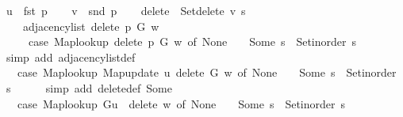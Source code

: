 \begin{isabellebody}
\ {\isacharquery}{\kern0pt}u\ {\isacharequal}{\kern0pt}\ {\isachardoublequoteopen}fst\ p{\isachardoublequoteclose}\isanewline
\ \ \isamarkupfalse%
\ {\isacharquery}{\kern0pt}v\ {\isacharequal}{\kern0pt}\ {\isachardoublequoteopen}snd\ p{\isachardoublequoteclose}\isanewline
\ \ \isamarkupfalse%
\ {\isacharquery}{\kern0pt}delete\ {\isacharequal}{\kern0pt}\ {\isachardoublequoteopen}Set{\isacharunderscore}{\kern0pt}delete\ {\isacharquery}{\kern0pt}v\ s{\isachardoublequoteclose}\isanewline
\ \ \isamarkupfalse%
\isanewline
\ \ \ \ {\isachardoublequoteopen}adjacency{\isacharunderscore}{\kern0pt}list\ {\isacharparenleft}{\kern0pt}delete\ p\ G{\isacharparenright}{\kern0pt}\ w\ {\isacharequal}{\kern0pt}\isanewline
\ \ \ \ \ {\isacharparenleft}{\kern0pt}case\ Map{\isacharunderscore}{\kern0pt}lookup\ {\isacharparenleft}{\kern0pt}delete\ p\ G{\isacharparenright}{\kern0pt}\ w\ of\ None\ {\isasymRightarrow}\ {\isacharbrackleft}{\kern0pt}{\isacharbrackright}{\kern0pt}\ {\isacharbar}{\kern0pt}\ Some\ s\ {\isasymRightarrow}\ Set{\isacharunderscore}{\kern0pt}inorder\ s{\isacharparenright}{\kern0pt}{\isachardoublequoteclose}\isanewline
\ \ \ \ \isamarkupfalse%
\ {\isacharparenleft}{\kern0pt}simp\ add{\isacharcolon}{\kern0pt}\ adjacency{\isacharunderscore}{\kern0pt}list{\isacharunderscore}{\kern0pt}def{\isacharparenright}{\kern0pt}\isanewline
\ \ \isamarkupfalse%
\ \isamarkupfalse%
\ {\isachardoublequoteopen}{\isachardot}{\kern0pt}{\isachardot}{\kern0pt}{\isachardot}{\kern0pt}\ {\isacharequal}{\kern0pt}\ {\isacharparenleft}{\kern0pt}case\ Map{\isacharunderscore}{\kern0pt}lookup\ {\isacharparenleft}{\kern0pt}Map{\isacharunderscore}{\kern0pt}update\ {\isacharquery}{\kern0pt}u\ {\isacharquery}{\kern0pt}delete\ G{\isacharparenright}{\kern0pt}\ w\ of\ None\ {\isasymRightarrow}\ {\isacharbrackleft}{\kern0pt}{\isacharbrackright}{\kern0pt}\ {\isacharbar}{\kern0pt}\ Some\ s\ {\isasymRightarrow}\ Set{\isacharunderscore}{\kern0pt}inorder\ s{\isacharparenright}{\kern0pt}{\isachardoublequoteclose}\isanewline
\ \ \ \ \isamarkupfalse%
\ {\isacharparenleft}{\kern0pt}simp\ add{\isacharcolon}{\kern0pt}\ delete{\isacharunderscore}{\kern0pt}def\ Some{\isacharparenright}{\kern0pt}\isanewline
\ \ \isamarkupfalse%
\ \isamarkupfalse%
\ {\isachardoublequoteopen}{\isachardot}{\kern0pt}{\isachardot}{\kern0pt}{\isachardot}{\kern0pt}\ {\isacharequal}{\kern0pt}\ {\isacharparenleft}{\kern0pt}case\ {\isacharparenleft}{\kern0pt}Map{\isacharunderscore}{\kern0pt}lookup\ G{\isacharparenleft}{\kern0pt}{\isacharquery}{\kern0pt}u\ {\isasymmapsto}\ {\isacharquery}{\kern0pt}delete{\isacharparenright}{\kern0pt}{\isacharparenright}{\kern0pt}\ w\ of\ None\ {\isasymRightarrow}\ {\isacharbrackleft}{\kern0pt}{\isacharbrackright}{\kern0pt}\ {\isacharbar}{\kern0pt}\ Some\ s\ {\isasymRightarrow}\ Set{\isacharunderscore}{\kern0pt}inorder\ s{\isacharparenright}{\kern0pt}{\isachardoublequoteclose}\isanewline

\end{isabellebody}
